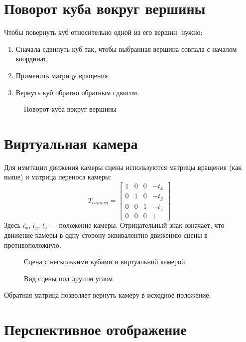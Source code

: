 \section{Поворот куба вокруг вершины}

Чтобы повернуть куб относительно одной из его вершин, нужно:
\begin{enumerate}
    \item Сначала сдвинуть куб так, чтобы выбранная вершина совпала с началом координат.
    \item Применить матрицу вращения.
    \item Вернуть куб обратно обратным сдвигом.
\end{enumerate}

\begin{figure}[h!]
    \centering
    \caption{Поворот куба вокруг вершины}
\end{figure}

\section{Виртуальная камера}

Для имитации движения камеры сцены используются матрицы вращения (как выше) и матрица переноса камеры:
\[
T_{camera} = \begin{bmatrix}
1 & 0 & 0 & -t_x \\
0 & 1 & 0 & -t_y \\
0 & 0 & 1 & -t_z \\
0 & 0 & 0 & 1
\end{bmatrix}
\]
Здесь $t_x$, $t_y$, $t_z$ --- положение камеры. Отрицательный знак означает, что движение камеры в одну сторону эквивалентно движению сцены в противоположную.

\begin{figure}[h!]
    \centering
    \caption{Сцена с несколькими кубами и виртуальной камерой}
\end{figure}

\begin{figure}[h!]
    \centering
    \caption{Вид сцены под другим углом}
\end{figure}

Обратная матрица позволяет вернуть камеру в исходное положение.

\section{Перспективное отображение}

